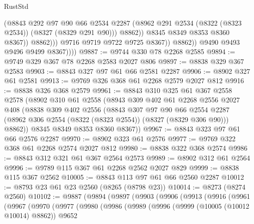 \begin{lexlean}{RustStd}
\begin{coremodule}
                                (@8843
                                  @292
                                  @97
                                  @90
                                  @66
                                  @2534
                                  @2287
                                  (@8962 @291 @2534 (@8322 (@8323 @2534)) (@8327 (@8329 @291 @90)))
                                  @8862))
                              @8345
                              @8349
                              @8353
                              @8360
                              @8367))
                          @8862)))
                    @9716
                    @9719
                    @9722
                    @9725
                    @8367))
                @8862))
            @9490
            @9493
            @9496
            @9499
            @8367))))
@9887 := @9744 @330 @78 @2268 @2585
@9894 := @9749 @329 @367 @78 @2268 @2583 @2027 @806
@9897 := @8838 @329 @367 @2583
@9903 := @8843 @327 @97 @61 @66 @2581 @2287
@9906 := @8902 @327 @61 @2581
@9913 := @9769 @326 @368 @61 @2268 @2579 @2027 @812
@9916 := @8838 @326 @368 @2579
@9961 := @8843
    @310
    @325
    @61
    @367
    @2558
    @2578
    (@8902
      @310
      @61
      @2558
      (@8943
        @309
        @402
        @61
        @2268
        @2556
        @2027
        @408
        (@8838
          @309
          @402
          @2556
          (@8843
            @307
            @97
            @90
            @66
            @2554
            @2287
            (@8962 @306 @2554 (@8322 (@8323 @2554)) (@8327 (@8329 @306 @90)))
            @8862))
        @8345
        @8349
        @8353
        @8360
        @8367))
@9967 := @8843 @323 @97 @61 @66 @2576 @2287
@9970 := @8902 @323 @61 @2576
@9977 := @9769 @322 @368 @61 @2268 @2574 @2027 @812
@9980 := @8838 @322 @368 @2574
@9986 := @8843 @312 @321 @61 @367 @2564 @2573
@9989 := @8902 @312 @61 @2564
@9996 := @9789 @115 @367 @61 @2268 @2562 @2027 @829
@9999 := @8838 @115 @367 @2562
@10005 := @8843 @113 @97 @61 @66 @2560 @2287
@10012 := @8793 @23 @61 @23 @2560 (@8265 (@8798 @23))
@10014 := @8273 (@8274 @2560)
@10102 := @9887
    (@9894
      (@9897
        (@9903
          (@9906
            (@9913
              (@9916
                (@9961
                  (@9967
                    (@9970
                      (@9977
                        (@9980
                          (@9986
                            (@9989
                              (@9996
                                (@9999 (@10005 (@10012 @10014) @8862))
                                @9652

\end{coremodule}
\end{lexlean}
